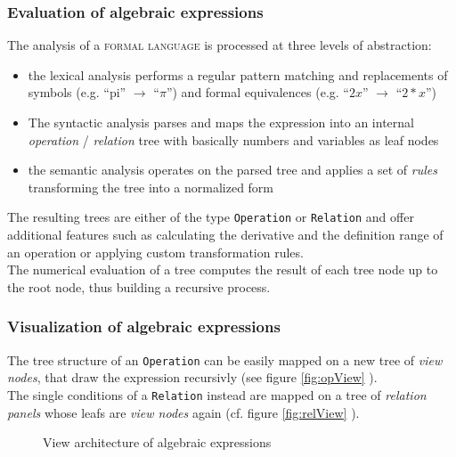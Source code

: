 \documentclass[a4paper,12pt]{article}
\newcommand{\name}[1]{\textsc{#1}}
\newcommand{\codename}[1]{\texttt{\small #1}}
\newcommand{\formlang}{\name{formal language }}
\begin{document}
\subsubsection*{Evaluation of algebraic expressions}

The analysis of a \formlang is processed at three levels of abstraction:
\begin{itemize}
  \item the lexical analysis performs a regular pattern matching and replacements of symbols (e.g.
  ``pi'' $\rightarrow$ ``$\pi$'') and formal equivalences (e.g. ``$2x$'' $\rightarrow$ ``$2 * x$'')
  \item The syntactic analysis parses and maps the expression into an internal \textit{operation} /
  \textit{relation} tree with basically numbers and variables as leaf nodes
  \item the semantic analysis operates on the parsed tree and applies a set of \textit{rules}
  transforming the tree into a normalized form
\end{itemize}
The resulting trees are either of the type \codename{Operation} or \codename{Relation} and offer additional
features such as calculating the derivative and the definition range of an operation or applying
custom transformation rules.\\
The numerical evaluation of a tree computes the result of each tree node up to the root node, thus
building a recursive process.

\subsubsection*{Visualization of algebraic expressions}

The tree structure of an \codename{Operation} can be easily mapped on a new tree of \textit{view nodes},
that draw the expression recursivly (see figure \ref{fig:opView} \cite{paehler}).\\
The single conditions of a \codename{Relation} instead are mapped on a tree of \textit{relation panels} 
whose leafs are \textit{view nodes} again (cf. figure \ref{fig:relView} \cite{paehler}).

\begin{figure}[h]
  \centering
  \hspace{1.0cm}
  \caption{View architecture of algebraic expressions \cite{paehler}}
\end{figure}
\end{document}
